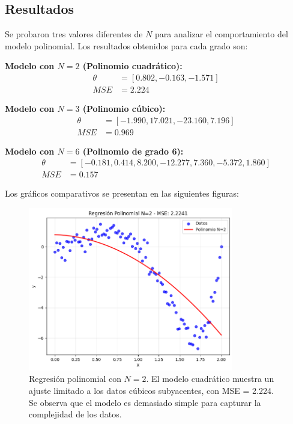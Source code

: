 \documentclass{article}
\begin{document}
\subsection{Resultados}
\setcounter{equation}{0}

Se probaron tres valores diferentes de $N$ para analizar el comportamiento del modelo polinomial. Los resultados obtenidos para cada grado son:

\textbf{Modelo con $N=2$ (Polinomio cuadrático):}
\begin{align}
    \theta &= [0.802, -0.163, -1.571] \\
    MSE &= 2.224
\end{align}

\textbf{Modelo con $N=3$ (Polinomio cúbico):}
\begin{align}
    \theta &= [-1.990, 17.021, -23.160, 7.196] \\
    MSE &= 0.969
\end{align}

\textbf{Modelo con $N=6$ (Polinomio de grado 6):}
\begin{align}
    \theta &= [-0.181, 0.414, 8.200, -12.277, 7.360, -5.372, 1.860] \\
    MSE &= 0.157
\end{align}

Los gráficos comparativos se presentan en las siguientes figuras:

\begin{figure}[H]
    \centering
    \includegraphics[width=0.8\textwidth]{images/8_N2.png}
    \caption{Regresión polinomial con $N=2$. El modelo cuadrático muestra un ajuste limitado a los datos cúbicos subyacentes, con MSE = 2.224. Se observa que el modelo es demasiado simple para capturar la complejidad de los datos.}
\end{figure}
\end{document}
